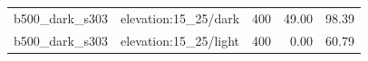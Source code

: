 \begin{longtable}{l>{\raggedright\arraybackslash}p{.42\linewidth}rrr}
b500\_\allowbreak{}dark\_\allowbreak{}s303 & %
elevation:15\_\allowbreak{}25/dark & %
400 & %
49.00 & %
98.39 \\ %

b500\_\allowbreak{}dark\_\allowbreak{}s303 & %
elevation:15\_\allowbreak{}25/light & %
400 & %
0.00 & %
60.79 \\ %


\end{longtable}
